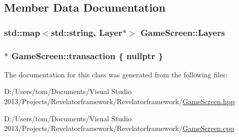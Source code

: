 \subsection{Member Data Documentation}
\hypertarget{class_game_screen_ab134d175092c247558838f11d66e9493}{
\subsubsection[{Layers}]{\setlength{\rightskip}{0pt plus 5cm}std\-::map$<$std\-::string, {\bf Layer}$\ast$$>$ Game\-Screen\-::\-Layers\hspace{0.3cm}{\ttfamily [protected]}}}\label{class_game_screen_ab134d175092c247558838f11d66e9493}
\hypertarget{class_game_screen_accd7b1f865eb3e0ab95ca4eb8b795b93}{
\subsubsection[{transaction}]{$\ast$ Game\-Screen\-::transaction \{ nullptr \}\hspace{0.3cm}{\ttfamily [protected]}}}\label{class_game_screen_accd7b1f865eb3e0ab95ca4eb8b795b93}


The documentation for this class was generated from the following files\-:\begin{DoxyCompactItemize}
\item 
D\-:/\-Users/tom/\-Documents/\-Visual Studio 2013/\-Projects/\-Revelatorframework/\-Revelatorframework/\hyperlink{_game_screen_8hpp}{Game\-Screen.\-hpp}\item 
D\-:/\-Users/tom/\-Documents/\-Visual Studio 2013/\-Projects/\-Revelatorframework/\-Revelatorframework/\hyperlink{_game_screen_8cpp}{Game\-Screen.\-cpp}\end{DoxyCompactItemize}

